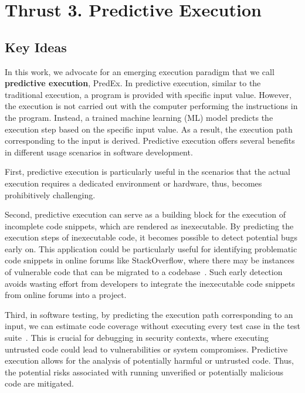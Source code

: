 \section{Thrust 3. Predictive Execution}
\label{sec:thrust3}

\subsection{Key Ideas}

In this work, we advocate for an emerging execution paradigm that we
call {\bf predictive execution}, PredEx. In predictive execution,
similar to the traditional execution, a program is provided with
specific input value. However, the execution is not carried out with
the computer performing the instructions in the program. Instead, a
trained machine learning (ML) model predicts the execution step based
on the specific input value. As a result, the execution path
corresponding to the input is derived. Predictive execution offers
several benefits in different usage scenarios in software development.

First, predictive execution is particularly useful in the scenarios
that the actual execution requires a dedicated environment or
hardware, thus, becomes prohibitively challenging. 

Second, predictive execution can serve as a building block for the
execution of incomplete code snippets, which are rendered as
inexecutable. By predicting the execution steps of inexecutable code,
it becomes possible to detect potential bugs early on. This
application could be particularly useful for identifying problematic
code snippets in online forums like StackOverflow, where there may be
instances of vulnerable code that can be migrated to a
codebase~\cite{verdi-tse22}. Such early detection avoids wasting
effort from developers to integrate the inexecutable code snippets
from online forums into a project.

Third, in software testing, by predicting the execution path
corresponding to an input, we can estimate code coverage without
executing every test case in the test
suite~\cite{ball-toplas94,elbaum-icsm01}. This is crucial for
debugging in security contexts, where executing untrusted code could
lead to vulnerabilities or system compromises. Predictive execution
allows for the analysis of potentially harmful or untrusted
code. Thus, the potential risks associated with running unverified or
potentially malicious code are mitigated.


